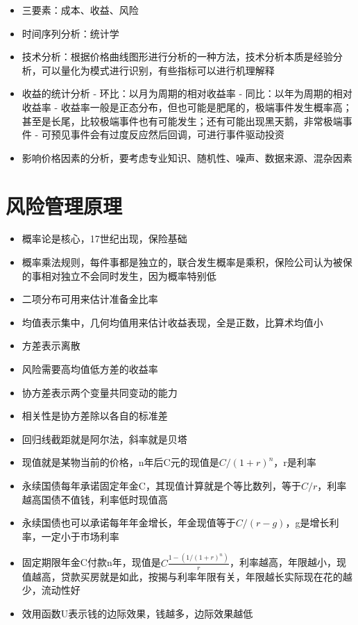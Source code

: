 \documentclass[
]{book}
\providecommand{\tightlist}{%
  \setlength{\itemsep}{0pt}\setlength{\parskip}{0pt}}
\begin{document}
\begin{itemize}
\tightlist
\item
  三要素：成本、收益、风险
\item
  时间序列分析：统计学
\item
  技术分析：根据价格曲线图形进行分析的一种方法，技术分析本质是经验分析，可以量化为模式进行识别，有些指标可以进行机理解释
\item
  收益的统计分析
  - 环比：以月为周期的相对收益率
  - 同比：以年为周期的相对收益率
  - 收益率一般是正态分布，但也可能是肥尾的，极端事件发生概率高；甚至是长尾，比较极端事件也有可能发生；还有可能出现黑天鹅，非常极端事件
  - 可预见事件会有过度反应然后回调，可进行事件驱动投资
\item
  影响价格因素的分析，要考虑专业知识、随机性、噪声、数据来源、混杂因素
\end{itemize}

\hypertarget{ux98ceux9669ux7ba1ux7406ux539fux7406}{%
\section{风险管理原理}\label{ux98ceux9669ux7ba1ux7406ux539fux7406}}

\begin{itemize}
\tightlist
\item
  概率论是核心，17世纪出现，保险基础
\item
  概率乘法规则，每件事都是独立的，联合发生概率是乘积，保险公司认为被保的事相对独立不会同时发生，因为概率特别低
\item
  二项分布可用来估计准备金比率
\item
  均值表示集中，几何均值用来估计收益表现，全是正数，比算术均值小
\item
  方差表示离散
\item
  风险需要高均值低方差的收益率
\item
  协方差表示两个变量共同变动的能力
\item
  相关性是协方差除以各自的标准差
\item
  回归线截距就是阿尔法，斜率就是贝塔
\item
  现值就是某物当前的价格，n年后C元的现值是\(C/(1+r)^n\)，r是利率
\item
  永续国债每年承诺固定年金C，其现值计算就是个等比数列，等于\(C/r\)，利率越高国债不值钱，利率低时现值高
\item
  永续国债也可以承诺每年年金增长，年金现值等于\(C/(r-g)\)，g是增长利率，一定小于市场利率
\item
  固定期限年金C付款n年，现值是\(C\frac{1-(1/(1+r)^n)}{r}\)，利率越高，年限越小，现值越高，贷款买房就是如此，按揭与利率年限有关，年限越长实际现在花的越少，流动性好
\item
  效用函数U表示钱的边际效果，钱越多，边际效果越低
\end{itemize}
\end{document}
